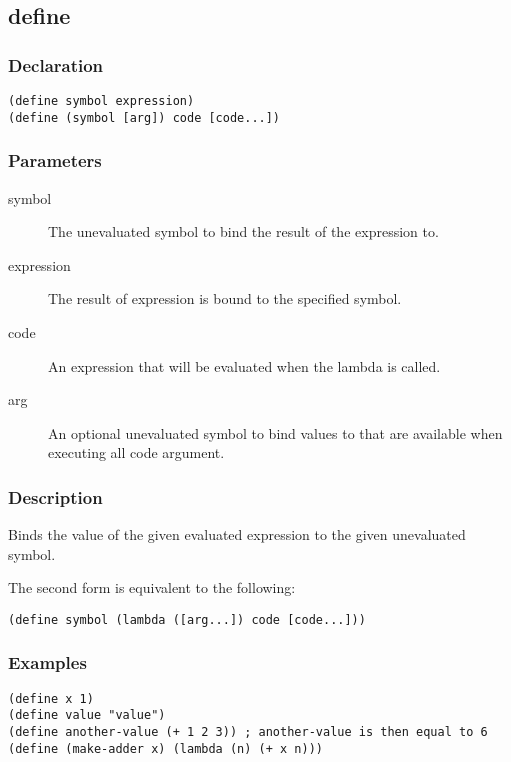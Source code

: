 \subsection{define}
\label{builtins/define}

\subsubsection{Declaration}
\begin{lstlisting}
(define symbol expression)
(define (symbol [arg]) code [code...])
\end{lstlisting}

\subsubsection{Parameters}
\begin{description}
	\item[symbol] The unevaluated symbol to bind the result of the expression to.
	\item[expression] The result of expression is bound to the specified symbol.
	\item[code] An expression that will be evaluated when the lambda is called.
	\item[arg] An optional unevaluated symbol to bind values to that are available when executing all code argument.
\end{description}

\subsubsection{Description}
Binds the value of the given evaluated expression to the given unevaluated symbol.

The second form is equivalent to the following:
\begin{lstlisting}
(define symbol (lambda ([arg...]) code [code...]))
\end{lstlisting}

\subsubsection{Examples}
\begin{lstlisting}
(define x 1)
(define value "value")
(define another-value (+ 1 2 3)) ; another-value is then equal to 6
(define (make-adder x) (lambda (n) (+ x n)))
\end{lstlisting}
